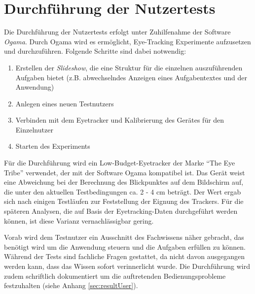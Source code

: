\section{Durchführung der Nutzertests} \label{sec:testExecution}
Die Durchführung der Nutzertests erfolgt unter Zuhilfenahme der Software \textit{Ogama}. Durch Ogama wird es ermöglicht, Eye-Tracking Experimente aufzusetzen und durchzuführen. Folgende Schritte sind dabei notwendig:\par
\begin{enumerate}
 \item Erstellen der \textit{Slideshow}, die eine Struktur für die einzelnen auszuführenden Aufgaben bietet (z.B. abwechselndes Anzeigen eines Aufgabentextes und der Anwendung)
 \item Anlegen eines neuen Testnutzers
 \item Verbinden mit dem Eyetracker und Kalibrierung des Gerätes für den Einzelnutzer
 \item Starten des Experiments
\end{enumerate}
Für die Durchführung wird ein Low-Budget-Eyetracker der Marke \enquote{The Eye Tribe} verwendet, der mit der Software Ogama kompatibel ist. Das Gerät weist eine Abweichung bei der Berechnung des Blickpunktes auf dem Bildschirm auf, die unter den aktuellen Testbedingungen ca. 2 - 4 cm beträgt. Der Wert ergab sich nach einigen Testläufen zur Feststellung der Eignung des Trackers. Für die späteren Analysen, die auf Basis der Eyetracking-Daten durchgeführt werden können, ist diese Varianz vernachlässigbar gering.\par
Vorab wird dem Testnutzer ein Ausschnitt des Fachwissens näher gebracht, das benötigt wird um die Anwendung steuern und die Aufgaben erfüllen zu können. Während der Tests sind fachliche Fragen gestattet, da nicht davon ausgegangen werden kann, dass das Wissen sofort verinnerlicht wurde. Die Durchführung wird zudem schriftlich dokumentiert um die auftretenden Bedienungsprobleme festzuhalten (siehe Anhang \ref{sec:resultUser}).\par
